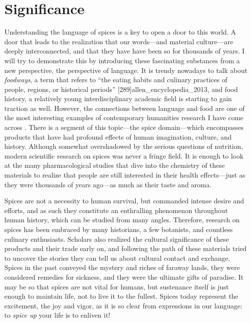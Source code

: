 \section{Significance}

Understanding the language of spices is a key to open a door to this world. A door that leads to the realization that our words---and material culture---are deeply interconnected, and that they have have been so for thousands of years. I will try to demonstrate this by introducing these fascinating substances from a new perspective, the perspective of language. It is trendy nowadays to talk about \textit{foodways}, a term that refers to ``the eating habits and culinary practices of people, regions, or historical periods'' [289]{allen_encyclopedia_2013}, and food history, a relatively young interdisciplinary academic field is starting to gain traction as well. However, the connections between language and food are one of the most interesting examples of contemporary humanities research I have come across \autocite[see][]{jurafsky_language_2014}. There is a segment of this topic---the spice domain---which encompasses products that have had profound effects of human imagination, culture, and history. Although somewhat overshadowed by the serious questions of nutrition, modern scientific research on spices was never a fringe field. It is enough to look at the many pharmacological studies that dive into the chemistry of these materials to realize that people are still interested in their health effects---just as they were thousands of years ago---as much as their taste and aroma.

Spices are not a necessity to human survival, but commanded intense desire and efforts, and as such they  constitute an enthralling phenomenon throughout human history, which can be studied from many angles. Therefore, research on spices has been embraced by many historians, a few botanists, and countless culinary enthusiasts. Scholars also realized the cultural significance of these products and their trade early on, and following the path of these materials tried to uncover the stories they can tell us about cultural contact and exchange. Spices in the past conveyed the mystery and riches of faraway lands, they were considered remedies for sickness, and they were the ultimate gifts of paradise. It may be so that spices are not vital for humans, but sustenance itself is just enough to maintain life, not to live it to the fullest. Spices today represent the excitement, the joy and vigor, as it is so clear from expressions in our language: to \emph{spice up} your life is to enliven it!



